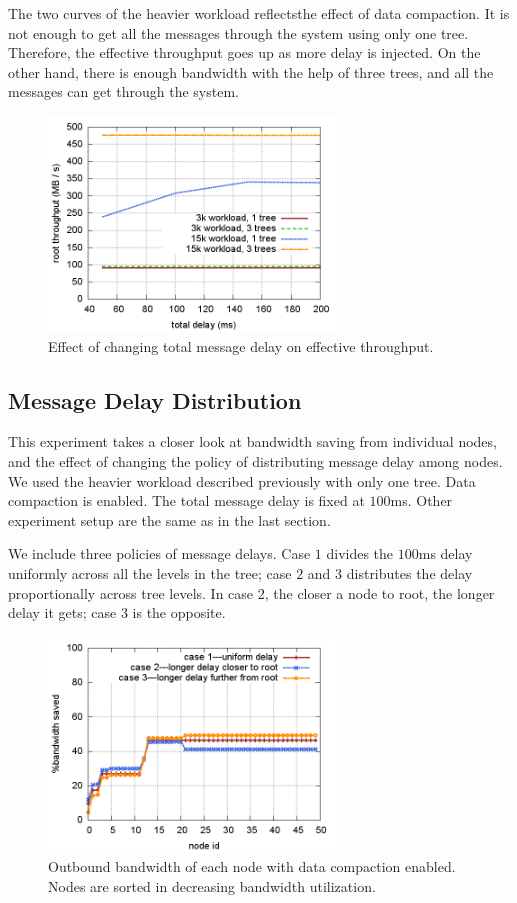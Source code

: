 The two curves of the heavier workload reflectsthe effect of data compaction.
It is not enough to get all the messages through the system using only one
tree.  Therefore, the effective throughput goes up as more delay is injected.
On the other hand, there is enough bandwidth with the help of three trees, and
all the messages can get through the system.

\begin{figure}[t]
\begin{center}
\includegraphics[width=3in]{img/eff-tp.png}
\end{center}
\caption{\label{fig:eff-tp} Effect of changing total message delay on
effective throughput.}
\end{figure}

\subsection{Message Delay Distribution}

This experiment takes a closer look at bandwidth saving from individual nodes,
and the effect of changing the policy of distributing message delay among
nodes.  We used the heavier workload described previously with only one tree.
Data compaction is enabled.  The total message delay is fixed at $100$ms.
Other experiment setup are the same as in the last section.

We include three policies of message delays.  Case $1$ divides the $100$ms
delay uniformly across all the levels in the tree; case $2$ and $3$ distributes
the delay proportionally across tree levels.  In case $2$, the closer a node to
root, the longer delay it gets; case $3$ is the opposite.

\begin{figure}[t]
\begin{center}
\includegraphics[width=3in]{img/node_saving.png}
\end{center}
\caption{\label{fig:node-saving} Outbound bandwidth of each node with data compaction
enabled.  Nodes are sorted in decreasing bandwidth utilization.}
\end{figure}

